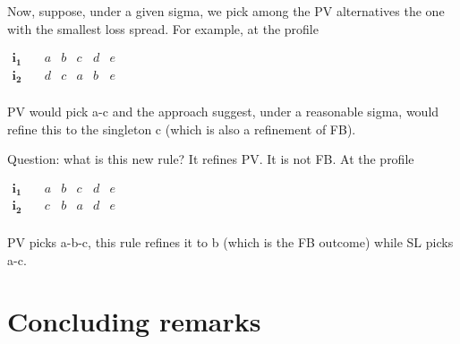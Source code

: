 \documentclass[version=3.21, pagesize, twoside=off, bibliography=totoc, DIV=calc, fontsize=12pt, a4paper]{scrartcl}
\begin{document}
\begin{remark}[Consideration]
Now, suppose, under a given sigma, we pick among the PV alternatives the one with the smallest loss spread. For example, at the profile 
\begin{center}
	$
	\begin{array}{cccccc}
		\mathbf{i_1} \quad &a&b&c&d&e\\
		\mathbf{i_2} \quad &d&c&a&b&e\\
	\end{array}
	$
\end{center}

PV would pick a-c and the approach suggest, under a reasonable sigma, would refine this to the singleton c (which is also a refinement of FB).

Question: what is this new rule? It refines PV. It is not FB. At the profile

\begin{center}
	$
	\begin{array}{cccccc}
		\mathbf{i_1} \quad &a&b&c&d&e\\
		\mathbf{i_2} \quad &c&b&a&d&e\\
	\end{array}
	$
\end{center}

PV picks a-b-c, this rule refines it to b (which is the FB outcome) while SL picks a-c.
\end{remark}
 
\section{Concluding remarks}
\end{document}
